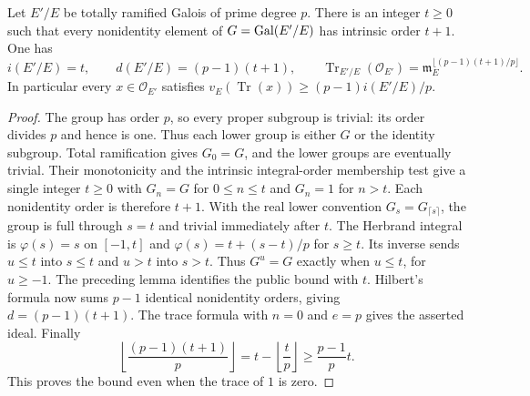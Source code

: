 \begin{lemma}
\label{fw:cyclic-prime-trace-bound}
\leanok
Let $E'/E$ be totally ramified Galois of prime degree $p$.
There is an integer $t\geq0$ such that every nonidentity element
of $G=\operatorname{Gal}(E'/E)$ has intrinsic order $t+1$.
One has
\[
 i(E'/E)=t,\qquad d(E'/E)=(p-1)(t+1),\qquad
 \operatorname{Tr}_{E'/E}(\mathcal O_{E'})
     =\mathfrak m_E^{\lfloor(p-1)(t+1)/p\rfloor}.
\]
In particular every $x\in\mathcal O_{E'}$ satisfies
$v_E(\operatorname{Tr}(x))\geq (p-1)i(E'/E)/p$.
\end{lemma}
\begin{proof}
The group has order $p$, so every proper subgroup is trivial:
its order divides $p$ and hence is one. Thus each lower group
is either $G$ or the identity subgroup. Total ramification gives
$G_0=G$, and the lower groups are eventually trivial. Their
monotonicity and the intrinsic integral-order membership test
give a single integer $t\geq0$ with $G_n=G$ for $0\leq n\leq t$
and $G_n=1$ for $n>t$. Each nonidentity order is therefore $t+1$.
With the real lower convention $G_s=G_{\lceil s\rceil}$, the
group is full through $s=t$ and trivial immediately after $t$.
The Herbrand integral is $\varphi(s)=s$ on $[-1,t]$ and
$\varphi(s)=t+(s-t)/p$ for $s\geq t$. Its inverse sends
$u\leq t$ into $s\leq t$ and $u>t$ into $s>t$.
Thus $G^u=G$ exactly when $u\leq t$, for $u\geq-1$.
The preceding lemma identifies the public bound with $t$.
Hilbert's formula now sums $p-1$ identical nonidentity orders,
giving $d=(p-1)(t+1)$. The trace formula with $n=0$ and $e=p$
gives the asserted ideal. Finally
\[
 \left\lfloor\frac{(p-1)(t+1)}p\right\rfloor
       =t-\left\lfloor\frac tp\right\rfloor
       \geq\frac{p-1}{p}t.
\]
This proves the bound even when the trace of $1$ is zero.
\end{proof}

